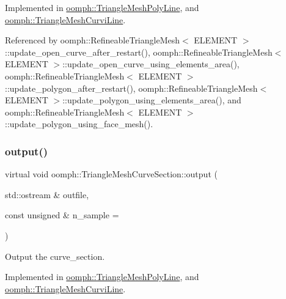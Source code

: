 Implemented in \hyperlink{classoomph_1_1TriangleMeshPolyLine_a7b6ab13f61cb9f4435dc4fc4fe1fa50d}{oomph\+::\+Triangle\+Mesh\+Poly\+Line}, and \hyperlink{classoomph_1_1TriangleMeshCurviLine_a4a60d6fadfae8165ed9fde9987ef4f0d}{oomph\+::\+Triangle\+Mesh\+Curvi\+Line}.



Referenced by oomph\+::\+Refineable\+Triangle\+Mesh$<$ E\+L\+E\+M\+E\+N\+T $>$\+::update\+\_\+open\+\_\+curve\+\_\+after\+\_\+restart(), oomph\+::\+Refineable\+Triangle\+Mesh$<$ E\+L\+E\+M\+E\+N\+T $>$\+::update\+\_\+open\+\_\+curve\+\_\+using\+\_\+elements\+\_\+area(), oomph\+::\+Refineable\+Triangle\+Mesh$<$ E\+L\+E\+M\+E\+N\+T $>$\+::update\+\_\+polygon\+\_\+after\+\_\+restart(), oomph\+::\+Refineable\+Triangle\+Mesh$<$ E\+L\+E\+M\+E\+N\+T $>$\+::update\+\_\+polygon\+\_\+using\+\_\+elements\+\_\+area(), and oomph\+::\+Refineable\+Triangle\+Mesh$<$ E\+L\+E\+M\+E\+N\+T $>$\+::update\+\_\+polygon\+\_\+using\+\_\+face\+\_\+mesh().

\mbox{\label{classoomph_1_1TriangleMeshCurveSection_a140b0bb85d7bf85cc025e19e996d5c53}} 
\subsubsection{\texorpdfstring{output()}{output()}}
{\footnotesize\ttfamily virtual void oomph\+::\+Triangle\+Mesh\+Curve\+Section\+::output (\begin{DoxyParamCaption}\item[{std\+::ostream \&}]{outfile,  }\item[{const unsigned \&}]{n\+\_\+sample = {} }\end{DoxyParamCaption})\hspace{0.3cm}{\ttfamily [pure virtual]}}



Output the curve\+\_\+section. 



Implemented in \hyperlink{classoomph_1_1TriangleMeshPolyLine_a8306f0768e83e29aac7d0d2f9fb3c175}{oomph\+::\+Triangle\+Mesh\+Poly\+Line}, and \hyperlink{classoomph_1_1TriangleMeshCurviLine_a4432e3848032cc78bc3282149c4d6cff}{oomph\+::\+Triangle\+Mesh\+Curvi\+Line}.

